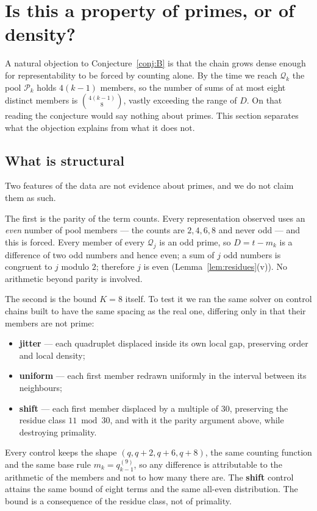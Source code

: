 \documentclass[11pt,a4paper]{article}
\newcommand{\Q}{\mathcal{Q}}
\newcommand{\Pool}{\mathcal{P}}
\begin{document}
\section{Is this a property of primes, or of density?}
\label{sec:density}

A natural objection to Conjecture~\ref{conj:B} is that the chain grows dense
enough for representability to be forced by counting alone. By the time we
reach $\Q_k$ the pool $\Pool_k$ holds $4(k-1)$ members, so the number of
sums of at most eight distinct members is $\binom{4(k-1)}{8}$, vastly
exceeding the range of $D$. On that reading the conjecture would say nothing
about primes. This section separates what the objection explains from what
it does not.

\subsection*{What is structural}

Two features of the data are not evidence about primes, and we do not claim
them as such.

The first is the parity of the term counts. Every representation observed
uses an \emph{even} number of pool members --- the counts are $2,4,6,8$ and
never odd --- and this is forced. Every member of every $\Q_j$ is an odd
prime, so $D=t-m_k$ is a difference of two odd numbers and hence even; a sum
of $j$ odd numbers is congruent to $j$ modulo $2$; therefore $j$ is even
(Lemma~\ref{lem:residues}(v)).
No arithmetic beyond parity is involved.

The second is the bound $K=8$ itself. To test it we ran the same solver on
control chains built to have the same spacing as the real one, differing
only in that their members are not prime:
\begin{itemize}
  \item \textbf{jitter} --- each quadruplet displaced inside its own local
        gap, preserving order and local density;
  \item \textbf{uniform} --- each first member redrawn uniformly in the
        interval between its neighbours;
  \item \textbf{shift} --- each first member displaced by a multiple of
        $30$, preserving the residue class $11 \bmod 30$, and with it the
        parity argument above, while destroying primality.
\end{itemize}
Every control keeps the shape $(q,q+2,q+6,q+8)$, the same counting function
and the same base rule $m_k=q_{k-1}^{(9)}$, so any difference is
attributable to the arithmetic of the members and not to how many there are.
The \textbf{shift} control attains the same bound of eight terms and the
same all-even distribution. The bound is a consequence of the residue class,
not of primality.
\end{document}
